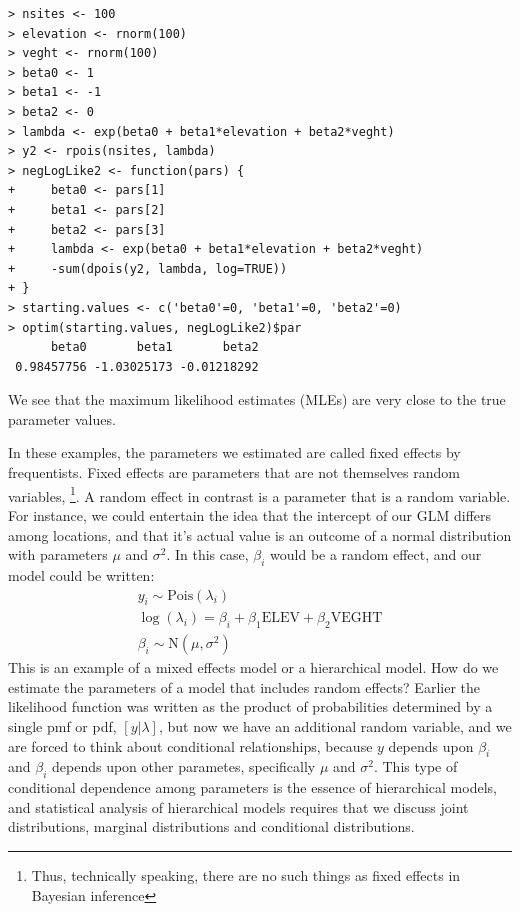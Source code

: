 \begin{verbatim}
> nsites <- 100
> elevation <- rnorm(100)
> veght <- rnorm(100)
> beta0 <- 1
> beta1 <- -1
> beta2 <- 0
> lambda <- exp(beta0 + beta1*elevation + beta2*veght)
> y2 <- rpois(nsites, lambda)
> negLogLike2 <- function(pars) {
+     beta0 <- pars[1]
+     beta1 <- pars[2]
+     beta2 <- pars[3]
+     lambda <- exp(beta0 + beta1*elevation + beta2*veght)
+     -sum(dpois(y2, lambda, log=TRUE))
+ }
> starting.values <- c('beta0'=0, 'beta1'=0, 'beta2'=0)
> optim(starting.values, negLogLike2)$par
      beta0       beta1       beta2
 0.98457756 -1.03025173 -0.01218292
\end{verbatim}
We see that the maximum likelihood estimates (MLEs) are very close to
the true parameter values.

In these examples, the parameters we estimated are called fixed
effects by frequentists. Fixed effects are parameters that are not
themselves random variables,
\footnote{Thus, technically speaking, there are no such
  things as fixed effects in Bayesian inference}. A random effect in
contrast is a parameter that is a random variable. For instance,
we could entertain the idea that the intercept of our GLM differs
among locations, and that it's actual value is an outcome of a normal
distribution with parameters $\mu$ and $\sigma^2$. In this case,
$\beta_i$ would be a random effect, and our model could be written:
\begin{gather}
y_i \sim \text{Pois}(\lambda_i) \\
\log(\lambda_i) = \beta_i + \beta_1\text{ELEV} + \beta_2\text{VEGHT} \\
\beta_i \sim \text{N}(\mu, \sigma^2)
\end{gather}
This is an example of a mixed effects model or a hierarchical
model. How do we estimate the parameters of a model that includes
random effects? Earlier the likelihood function was written as the
product of probabilities determined by a single pmf or pdf,
$[y|\lambda]$, but now we have an additional random variable, and we
are forced to think about conditional relationships, because $y$
depends upon $\beta_i$ and $\beta_i$ depends upon other parametes,
specifically $\mu$ and $\sigma^2$.
This type of conditional dependence among parameters is the essence of hierarchical
models, and statistical analysis of hierarchical models requires that
we discuss joint distributions, marginal distributions and conditional
distributions.





